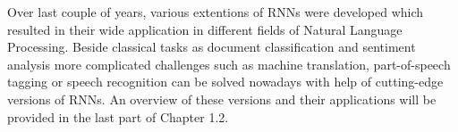 \documentclass[
]{article}
\begin{document}
Over last couple of years, various extentions of RNNs were developed
which resulted in their wide application in different fields of Natural
Language Processing. Beside classical tasks as document classification
and sentiment analysis more complicated challenges such as machine
translation, part-of-speech tagging or speech recognition can be solved
nowadays with help of cutting-edge versions of RNNs. An overview of
these versions and their applications will be provided in the last part
of Chapter 1.2.
\end{document}
